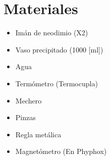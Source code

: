\section{Materiales}
\begin{itemize}
    \item Imán de neodimio (X2)
    \item Vaso precipitado (1000 [ml])
    \item Agua
    \item Termómetro (Termocupla)
    \item Mechero
    \item Pinzas
    \item Regla metálica
    \item Magnetómetro (En Phyphox)
\end{itemize}
